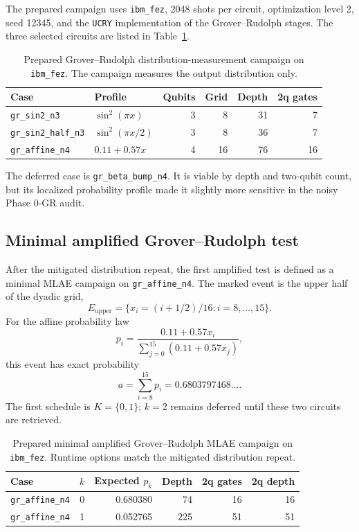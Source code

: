 The prepared campaign uses \texttt{ibm\_fez}, 2048 shots per circuit,
optimization level 2, seed 12345, and the \texttt{UCRY} implementation of the
Grover--Rudolph stages. The three selected circuits are listed in
Table~\ref{tab:gr-distribution-campaign}.

\begin{table}[h]
\centering
\begin{tabular}{llrrrr}
\toprule
Case & Profile & Qubits & Grid & Depth & 2q gates \\
\midrule
\texttt{gr\_sin2\_n3} & \(\sin^2(\pi x)\) & 3 & 8 & 31 & 7 \\
\texttt{gr\_sin2\_half\_n3} & \(\sin^2(\pi x/2)\) & 3 & 8 & 36 & 7 \\
\texttt{gr\_affine\_n4} & \(0.11+0.57x\) & 4 & 16 & 76 & 16 \\
\bottomrule
\end{tabular}
\caption{Prepared Grover--Rudolph distribution-measurement campaign on
\texttt{ibm\_fez}. The campaign measures the output distribution only.}
\label{tab:gr-distribution-campaign}
\end{table}

The deferred case is \texttt{gr\_beta\_bump\_n4}. It is viable by depth and
two-qubit count, but its localized probability profile made it slightly more
sensitive in the noisy Phase 0-GR audit.

\subsection{Minimal amplified Grover--Rudolph test}

After the mitigated distribution repeat, the first amplified test is defined as
a minimal MLAE campaign on \texttt{gr\_affine\_n4}. The marked event is the
upper half of the dyadic grid,
\[
  E_{\mathrm{upper}}
  =
  \{x_i=(i+1/2)/16: i=8,\ldots,15\}.
\]
For the affine probability law
\[
  p_i=
  \frac{0.11+0.57x_i}{\sum_{j=0}^{15}(0.11+0.57x_j)},
\]
this event has exact probability
\[
  a
  =
  \sum_{i=8}^{15}p_i
  =
  0.6803797468\ldots.
\]
The first schedule is \(K=\{0,1\}\); \(k=2\) remains deferred until these two
circuits are retrieved.

\begin{table}[h]
\centering
\begin{tabular}{lrrrrr}
\toprule
Case & \(k\) & Expected \(p_k\) & Depth & 2q gates & 2q depth \\
\midrule
\texttt{gr\_affine\_n4} & 0 & 0.680380 & 74 & 16 & 16 \\
\texttt{gr\_affine\_n4} & 1 & 0.052765 & 225 & 51 & 51 \\
\bottomrule
\end{tabular}
\caption{Prepared minimal amplified Grover--Rudolph MLAE campaign on
\texttt{ibm\_fez}. Runtime options match the mitigated distribution repeat.}
\label{tab:phase4-gr-mlae-prepared}
\end{table}

